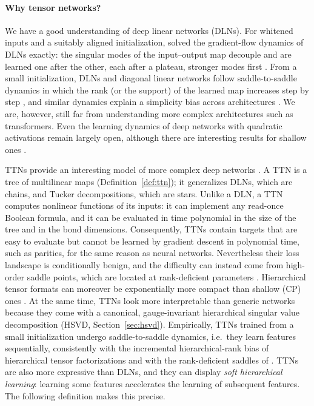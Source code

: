 \documentclass[11pt]{article}
\theoremstyle{definition}
\numberwithin{equation}{section}
\begin{document}
\paragraph{Why tensor networks?}
We have a good understanding of deep linear networks (DLNs). For whitened inputs and a suitably aligned initialization, \citet{saxe2014exact} solved the gradient-flow dynamics of DLNs exactly: the singular modes of the input--output map decouple and are learned one after the other, each after a plateau, stronger modes first \citep[see also][]{saxe2019mathematical}. From a small initialization, DLNs and diagonal linear networks follow saddle-to-saddle dynamics in which the rank (or the support) of the learned map increases step by step \citep{jacot2021saddle,pesme2023saddle}, and similar dynamics explain a simplicity bias across architectures \citep{zhang2026saddle}. We are, however, still far from understanding more complex architectures such as transformers. Even the learning dynamics of deep networks with quadratic activations remain largely open, although there are interesting results for shallow ones \citep[e.g.][]{du2018power,sarao2020optimization}.

TTNs provide an interesting model of more complex deep networks \citep{furman2026benign}. A TTN is a tree of multilinear maps (Definition~\ref{def:ttn}); it generalizes DLNs, which are chains, and Tucker decompositions, which are stars. Unlike a DLN, a TTN computes nonlinear functions of its inputs: it can implement any read-once Boolean formula, and it can be evaluated in time polynomial in the size of the tree and in the bond dimensions. Consequently, TTNs contain targets that are easy to evaluate but cannot be learned by gradient descent in polynomial time, such as parities, for the same reason as neural networks. Nevertheless their loss landscape is conditionally benign, and the difficulty can instead come from high-order saddle points, which are located at rank-deficient parameters \citep[Theorems~4.3 and 5.2, Proposition~5.3]{furman2026benign}. Hierarchical tensor formats can moreover be exponentially more compact than shallow (CP) ones \citep{cohen2016expressive}. At the same time, TTNs look more interpretable than generic networks because they come with a canonical, gauge-invariant hierarchical singular value decomposition (HSVD, Section~\ref{sec:hsvd}). Empirically, TTNs trained from a small initialization undergo saddle-to-saddle dynamics, i.e.\ they learn features sequentially, consistently with the incremental hierarchical-rank bias of hierarchical tensor factorizations \citep{razin2022implicit} and with the rank-deficient saddles of \citet{furman2026benign}. TTNs are also more expressive than DLNs, and they can display \emph{soft hierarchical learning}: learning some features accelerates the learning of subsequent features. The following definition makes this precise.
\end{document}
